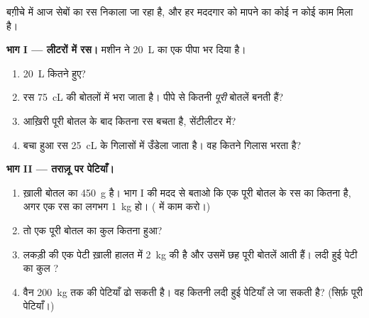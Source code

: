 \begin{problem}[{सप्ताहांत समस्या --- बग़ीचे में रस निकालने का दिन;
लीटरों से बोतलों तक, पेटियों से तराज़ू तक; और जग में गिरा कंकड़}]\label{pb:g6:mass-and-volume:1}
बग़ीचे में आज सेबों का रस निकाला जा रहा है, और हर मददगार को मापने का
कोई न कोई काम मिला है।

\medskip\noindent\textbf{भाग I --- लीटरों में रस।}
मशीन ने \qty{20}{L} का एक पीपा भर दिया है।
\begin{enumerate}
  \item \qty{20}{L} कितने  हुए?
  \item रस \qty{75}{cL} की बोतलों में भरा जाता है। पीपे से कितनी
        \emph{पूरी} बोतलें बनती हैं?
  \item आख़िरी पूरी बोतल के बाद कितना रस बचता है, सेंटीलीटर में?
  \item बचा हुआ रस \qty{25}{cL} के गिलासों में उँडेला जाता है। वह
        कितने गिलास भरता है?
\end{enumerate}

\medskip\noindent\textbf{भाग II --- तराज़ू पर पेटियाँ।}
\begin{enumerate}[resume]
  \item ख़ाली बोतल का  \qty{450}{g} है। भाग I की मदद से
        बताओ कि एक पूरी बोतल के रस का  कितना है, अगर एक
         रस का  लगभग \qty{1}{kg} हो। ( में काम
        करो।)
  \item तो एक पूरी बोतल का कुल  कितना हुआ?
  \item लकड़ी की एक पेटी ख़ाली हालत में \qty{2}{kg} की है और उसमें
        छह पूरी बोतलें आती हैं। लदी हुई पेटी का कुल ?
  \item वैन \qty{200}{kg} तक की पेटियाँ ढो सकती है। वह कितनी लदी
        हुई पेटियाँ ले जा सकती है? (सिर्फ़ पूरी पेटियाँ।)
\end{enumerate}


\end{problem}

